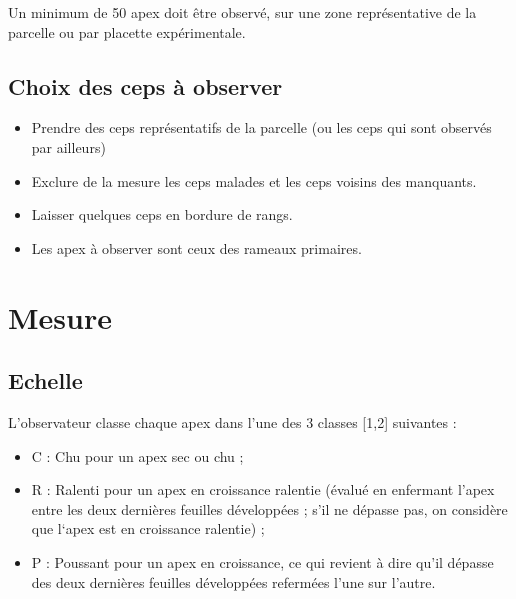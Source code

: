 \documentclass[
  a4paperpaper,
  DIV=11,
  numbers=noendperiod]{scrartcl}
\providecommand{\tightlist}{%
  \setlength{\itemsep}{0pt}\setlength{\parskip}{0pt}}\usepackage{longtable,booktabs,array}
\begin{document}
Un minimum de 50 apex doit être observé, sur une zone représentative de
la parcelle ou par placette expérimentale.

\subsection{Choix des ceps à
observer}\label{choix-des-ceps-uxe0-observer}

\begin{itemize}
\tightlist
\item
  Prendre des ceps représentatifs de la parcelle (ou les ceps qui sont
  observés par ailleurs)
\item
  Exclure de la mesure les ceps malades et les ceps voisins des
  manquants.
\item
  Laisser quelques ceps en bordure de rangs.
\item
  Les apex à observer sont ceux des rameaux primaires.
\end{itemize}

\section{Mesure}\label{mesure}

\subsection{Echelle}\label{echelle}

L'observateur classe chaque apex dans l'une des 3 classes {[}1,2{]}
suivantes :

\begin{itemize}
\tightlist
\item
  C : Chu pour un apex sec ou chu ;
\item
  R : Ralenti pour un apex en croissance ralentie (évalué en enfermant
  l'apex entre les deux dernières feuilles développées ; s'il ne dépasse
  pas, on considère que l`apex est en croissance ralentie) ;
\item
  P : Poussant pour un apex en croissance, ce qui revient à dire qu'il
  dépasse des deux dernières feuilles développées refermées l'une sur
  l'autre.
\end{itemize}
\end{document}
